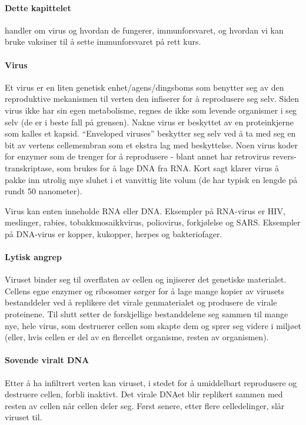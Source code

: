 
\paragraph{Dette kapittelet} handler om virus og hvordan de fungerer, immunforsvaret, og hvordan vi kan bruke vaksiner til å sette immunforsvaret på rett kurs.


\paragraph{Virus} Et virus er en liten genetisk enhet/agens/dingsboms som benytter seg av den reproduktive mekanismen til verten den infiserer for å reprodusere seg selv. Siden virus ikke har sin egen metabolisme, regnes de ikke som levende organismer i seg selv (de er i beste fall på grensen). Nakne virus er beskyttet av en proteinkjerne som kalles et kapsid. ``Enveloped viruses'' beskytter seg selv ved å ta med seg en bit av vertens cellemembran som et ekstra lag med beskyttelse. Noen virus koder for enzymer som de trenger for å reprodusere - blant annet har retrovirus revers-transkriptase, som brukes for å lage DNA fra RNA. Kort sagt klarer virus å pakke inn utrolig mye sluhet i et vanvittig lite volum (de har typisk en lengde på rundt 50 nanometer).

Virus kan enten inneholde RNA eller DNA. Eksempler på RNA-virus er HIV, meslinger, rabies, tobakkmosaikkvirus, poliovirus, forkjølelse og SARS. Eksempler på DNA-virus er kopper, kukopper, herpes og bakteriofager.

\paragraph{Lytisk angrep} Viruset binder seg til overflaten av cellen og injiserer det genetiske materialet. Cellens egne enzymer og ribosomer sørger for å lage mange kopier av virusets bestanddeler ved å replikere det virale genmaterialet og produsere de virale proteinene. Til slutt setter de forskjellige bestanddelene seg sammen til mange nye, hele virus, som destruerer cellen som skapte dem og sprer seg videre i miljøet (eller, hvis cellen er del av en flercellet organisme, resten av organismen). 

\paragraph{Sovende viralt DNA} Etter å ha infiltrert verten kan viruset, i stedet for å umiddelbart reprodusere og destruere cellen, forbli inaktivt. Det virale DNAet blir replikert sammen med resten av cellen når cellen deler seg. Først senere, etter flere celledelinger, slår viruset til.

